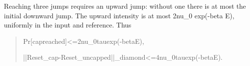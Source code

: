 \documentclass[
]{article}
\begin{document}
Reaching three jumps requires an upward jump: without one there is at
most the initial downward jump. The upward intensity is at most 2nu\_0
exp(-beta E), uniformly in the input and reference. Thus

\begin{quote}\small\ttfamily\raggedright\setlength{\parskip}{0pt}
\noindent P\allowbreak{}r\allowbreak{}[\allowbreak{}c\allowbreak{}a\allowbreak{}p\allowbreak{}\hspace*{0.525em}\allowbreak{}r\allowbreak{}e\allowbreak{}a\allowbreak{}c\allowbreak{}h\allowbreak{}e\allowbreak{}d\allowbreak{}]\allowbreak{}<\allowbreak{}=\allowbreak{}2\allowbreak{}n\allowbreak{}u\allowbreak{}\_\allowbreak{}0\allowbreak{}\hspace*{0.525em}\allowbreak{}t\allowbreak{}a\allowbreak{}u\allowbreak{}\hspace*{0.525em}\allowbreak{}e\allowbreak{}x\allowbreak{}p\allowbreak{}(\allowbreak{}-\allowbreak{}b\allowbreak{}e\allowbreak{}t\allowbreak{}a\allowbreak{}\hspace*{0.525em}\allowbreak{}E\allowbreak{})\allowbreak{},\par
\noindent |\allowbreak{}|\allowbreak{}R\allowbreak{}e\allowbreak{}s\allowbreak{}e\allowbreak{}t\allowbreak{}\_\allowbreak{}c\allowbreak{}a\allowbreak{}p\allowbreak{}-\allowbreak{}R\allowbreak{}e\allowbreak{}s\allowbreak{}e\allowbreak{}t\allowbreak{}\_\allowbreak{}u\allowbreak{}n\allowbreak{}c\allowbreak{}a\allowbreak{}p\allowbreak{}p\allowbreak{}e\allowbreak{}d\allowbreak{}|\allowbreak{}|\allowbreak{}\_\allowbreak{}d\allowbreak{}i\allowbreak{}a\allowbreak{}m\allowbreak{}o\allowbreak{}n\allowbreak{}d\allowbreak{}<\allowbreak{}=\allowbreak{}4\allowbreak{}n\allowbreak{}u\allowbreak{}\_\allowbreak{}0\allowbreak{}\hspace*{0.525em}\allowbreak{}t\allowbreak{}a\allowbreak{}u\allowbreak{}\hspace*{0.525em}\allowbreak{}e\allowbreak{}x\allowbreak{}p\allowbreak{}(\allowbreak{}-\allowbreak{}b\allowbreak{}e\allowbreak{}t\allowbreak{}a\allowbreak{}\hspace*{0.525em}\allowbreak{}E\allowbreak{})\allowbreak{}.\par
\end{quote}
\end{document}
